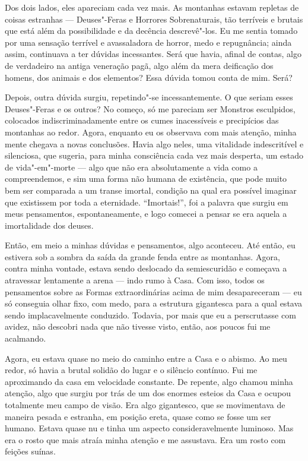 Dos dois lados, eles apareciam cada vez mais. As montanhas estavam repletas de coisas estranhas --- Deuses"-Feras e
Horrores Sobrenaturais, tão terríveis e brutais que está além da possibilidade e da decência descrevê"-los. Eu me
sentia tomado por uma sensação terrível e avassaladora de horror, medo e repugnância; ainda assim, continuava a ter
dúvidas incessantes. Será que havia, afinal de contas, algo de verdadeiro na antiga veneração pagã, algo além da mera
deificação dos homens, dos animais e dos elementos? Essa dúvida tomou conta de mim. Será?

Depois, outra dúvida surgiu, repetindo"-se incessantemente. O que seriam esses Deuses"-Feras e os outros? No começo, só
me pareciam ser Monstros esculpidos, colocados indiscriminadamente entre os cumes inacessíveis e precipícios das
montanhas ao redor. Agora, enquanto eu os observava com mais atenção, minha mente chegava a novas conclusões. Havia
algo neles, uma vitalidade indescritível e silenciosa, que sugeria, para minha consciência cada vez mais desperta, um
estado de vida"-em"-morte --- algo que não era absolutamente a vida como a compreendemos, e sim uma forma não humana de
existência, que pode muito bem ser comparada a um transe imortal, condição na qual era possível imaginar que existissem
por toda a eternidade. ``Imortais!'', foi a palavra que surgiu em meus pensamentos, espontaneamente, e logo comecei a
pensar se era aquela a imortalidade dos deuses.

Então, em meio a minhas dúvidas e pensamentos, algo aconteceu. Até então, eu estivera sob a sombra da saída da grande
fenda entre as montanhas. Agora, contra minha vontade, estava sendo deslocado da semiescuridão e começava a atravessar
lentamente a arena --- indo rumo à Casa. Com isso, todos os pensamentos sobre as Formas extraordinárias acima de mim
desapareceram --- eu só conseguia olhar fixo, com medo, para a estrutura gigantesca para a qual estava sendo
implacavelmente conduzido. Todavia, por mais que eu a perscrutasse com avidez, não descobri nada que não tivesse
visto, então, aos poucos fui me acalmando.

Agora, eu estava quase no meio do caminho entre a Casa e o abismo. Ao meu redor, só havia a brutal solidão do lugar e o
silêncio contínuo. Fui me aproximando da casa em velocidade constante. De repente, algo chamou minha atenção,
algo que surgiu por trás de um dos enormes esteios da Casa e ocupou totalmente meu campo de visão. Era algo gigantesco,
que se movimentava de maneira pesada e estranha, em posição ereta, quase como se fosse um ser humano. Estava quase nu e
tinha um aspecto consideravelmente luminoso. Mas era o rosto que mais atraía minha atenção e me assustava. Era um rosto
com feições suínas.

